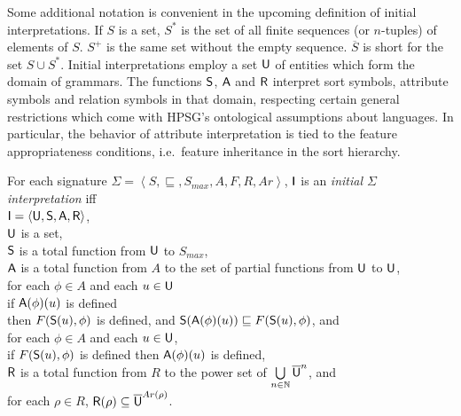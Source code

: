 \documentclass[output=paper
 	        ,biblatex
                ,babelshorthands
                ,newtxmath
                ,draftmode
                ,colorlinks, citecolor=brown
]{langscibook}
\begin{document}
{Some additional notation is convenient in the upcoming definition of
initial interpretations. If $S$ is a
set, $S^{*}$ is the set of all finite sequences (or $n$-tuples) of elements
of $S$. $S^{+}$ is the same set without the empty sequence. $\overline{S}$
is short for the set $S\cup S^{*}$. Initial interpretations employ a set
$\mathsf{U}$ of entities which form the domain of grammars. The functions
$\mathsf{S}$, $\mathsf{A}$ and $\mathsf{R}$ interpret sort symbols, attribute symbols
and relation symbols in that domain, respecting certain general restrictions which come with
HPSG's ontological assumptions about languages. In particular, the behavior of
attribute interpretation is tied to the feature appropriateness conditions,
i.e.\ feature inheritance in the sort hierarchy.

\begin{mydef}\label{def-initial-int}
  For each signature $\Sigma=\left<S,\sqsubseteq,S_{max},A,F,R,Ar\right>$,
  $\mathsf{I}$ is an \emph{initial $\Sigma$ interpretation} iff\\
  $\mathsf{I} = \langle\mathsf{U},\mathsf{S},\mathsf{A},\mathsf{R}\rangle$,\\
  $\mathsf{U}$ is a set,\\
  $\mathsf{S}$ is a total function from $\mathsf{U}$ to $S_{max}$,\\
  $\mathsf{A}$ is a total function from $A$ to the set of partial functions from
  $\mathsf{U}$ to $\mathsf{U}$,\\
  for each $\phi\in A$ and each $u\in\mathsf{U}$\\
  \hspace*{.5cm} if $\mathsf{A}(\phi)(u)$ is defined\\
  \hspace*{.5cm} then $F(\mathsf{S}(u),\phi)$ is defined, and
  $\mathsf{S}(\mathsf{A}(\phi)(u))\sqsubseteq F(\mathsf{S}(u),\phi)$, and\\
  for each $\phi\in A$ and each $u\in\mathsf{U}$,\\
  \hspace*{.5cm} if $F(\mathsf{S}(u),\phi)$ is defined
  then $\mathsf{A}(\phi)(u)$ is defined,\\
  $\mathsf{R}$ is a total function from $R$ to the power set of
  $\bigcup\limits_{n\in\mathbb{N}}{\overline{\mathsf{U}}}^n$, and\\
  \hspace*{.5cm} for each $\rho\in R$,
  $\mathsf{R}(\rho)\subseteq\overline{\mathsf{U}}^{Ar(\rho)}$.
\end{mydef}

}
\end{document}
